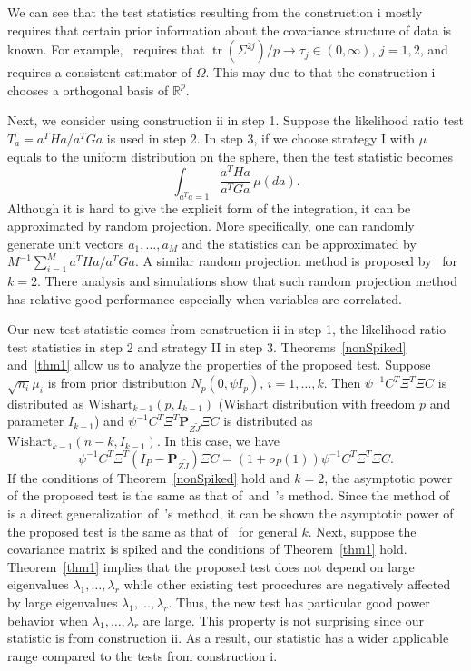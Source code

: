 \documentclass[12pt]{article} %
\DeclareMathOperator{\mytr}{tr}
\newcommand{\bP}{\mathbf{P}}
\theoremstyle{definition}
\begin{document}
We can see that the test statistics resulting from the construction i mostly requires that certain prior information about the covariance structure of data is known.
For example,~\citet{Schott2007Some} requires that $\mytr(\Sigma^{2j})/p\to \tau_j\in(0,\infty)$, $j=1,2$, and~\citet{Cai2014High} requires a consistent estimator of $\Omega$.
This may due to that the construction i chooses a orthogonal basis of $\mathbb{R}^p$.




Next, we consider using  construction ii in step 1.
Suppose the likelihood ratio test $T_a=a^T H a/a^T G a$ is used in step 2.
In step 3, if we choose strategy I with $\mu$ equals to the uniform distribution on the sphere, then the test statistic becomes
$$
\int_{a^T a=1} \frac{a^T H a}{a^T G a}\, \mu(da).
$$
Although it is hard to give the explicit form of the integration, it can be approximated by random projection. More specifically, one can randomly generate unit vectors $a_1,\ldots,a_M$ and the statistics can be approximated by $M^{-1}\sum_{i=1}^M a^T Ha/a^T G a$.
A similar random projection method is proposed by~\cite{Lopes2015A} for $k=2$.
There analysis and simulations show that such random projection method has relative good performance especially when variables are correlated.

Our new test statistic comes from construction ii in step 1, the likelihood ratio test statistics in step 2 and strategy II in step 3.
Theorems~\ref{nonSpiked} and~\ref{thm1} allow us to analyze the properties of the proposed test.
Suppose $\sqrt{n_i}\mu_i$ is from prior distribution $N_p(0,\psi I_p)$, $i=1,\ldots, k$.
Then $\psi^{-1}C^T \Xi^T \Xi C$ is distributed as $\text{Wishart}_{k-1}(p,I_{k-1})$ (Wishart distribution with freedom $p$ and parameter $I_{k-1}$) and $\psi^{-1}C^T \Xi^T \bP_{Z\tilde{J}}\Xi C$ is distributed as $\text{Wishart}_{k-1}(n-k,I_{k-1})$.
In this case, we have
$$
\psi^{-1}C^T \Xi^T (I_P-\bP_{Z\tilde{J}})\Xi C=
(1+o_P(1))\psi^{-1}C^T \Xi^T \Xi C.
$$
If the conditions of Theorem~\ref{nonSpiked} hold and $k=2$, the asymptotic power of the proposed test is the same as that of~\cite{Bai1996Efiect}and~\cite{Chen2010A}'s method.
Since the method of~\cite{Schott2007Some} is a direct generalization of~\cite{Bai1996Efiect}'s method, it can be shown the asymptotic power of the proposed test is the same as that of~\cite{Schott2007Some} for general $k$.
Next, suppose the covariance matrix is spiked and the conditions of Theorem~\ref{thm1} hold.
Theorem~\ref{thm1} implies that the proposed test does not depend on large eigenvalues $\lambda_1,\ldots,\lambda_r$ while other existing test procedures are negatively affected by large eigenvalues $\lambda_1,\ldots,\lambda_r$.   
Thus, the new test has particular good power behavior when $\lambda_1,\ldots,\lambda_r$ are large.
 This property is not surprising since our statistic is from construction ii.
As a result, our statistic has a wider applicable range compared to the tests from construction i.
\end{document}
